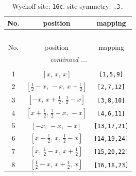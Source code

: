 \documentclass[fleqn,8pt]{jsarticle}
\begin{document}
\renewcommand{\arraystretch}{1.2}
\begin{longtable}{ccc}
\caption{Wyckoff site: {\tt 16c}, site symmetry: {\tt .3.}}
 \\
 \hline \hline
No. & position & mapping \\ \hline \endfirsthead

\multicolumn{2}{l}{\tablename\ \thetable{}} \\
 \hline \hline
No. & position & mapping \\ \hline \endhead

 \hline \hline
\multicolumn{2}{r}{\footnotesize\it continued ...} \\ \endfoot

 \hline \hline
\multicolumn{2}{r}{} \\ \endlastfoot

1 & $\left[ x,\, x,\, x \right]$ & {\tt [1,5,9]} \\ \hline
2 & $\left[ \frac{1}{2} - x,\, - x,\, x + \frac{1}{2} \right]$ & {\tt [2,7,12]} \\ \hline
3 & $\left[ - x,\, x + \frac{1}{2},\, \frac{1}{2} - x \right]$ & {\tt [3,8,10]} \\ \hline
4 & $\left[ x + \frac{1}{2},\, \frac{1}{2} - x,\, - x \right]$ & {\tt [4,6,11]} \\ \hline
5 & $\left[ - x,\, - x,\, - x \right]$ & {\tt [13,17,21]} \\ \hline
6 & $\left[ x + \frac{1}{2},\, x,\, \frac{1}{2} - x \right]$ & {\tt [14,19,24]} \\ \hline
7 & $\left[ x,\, \frac{1}{2} - x,\, x + \frac{1}{2} \right]$ & {\tt [15,20,22]} \\ \hline
8 & $\left[ \frac{1}{2} - x,\, x + \frac{1}{2},\, x \right]$ & {\tt [16,18,23]} \\
\end{longtable}
\renewcommand{\arraystretch}{1.2}
\end{document}
